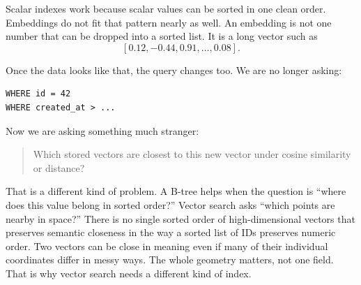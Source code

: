 \documentclass[12pt]{article}
\begin{document}
Scalar indexes work because scalar values can be sorted in one clean
order. Embeddings do not fit that pattern nearly as well. An embedding is
not one number that can be dropped into a sorted list. It is a long vector
such as
\[
[0.12, -0.44, 0.91, \dots, 0.08].
\]

Once the data looks like that, the query changes too. We are no longer
asking:

\begin{verbatim}
WHERE id = 42
WHERE created_at > ...
\end{verbatim}

Now we are asking something much stranger:

\begin{quote}
Which stored vectors are closest to this new vector under cosine
similarity or distance?
\end{quote}

That is a different kind of problem. A B-tree helps when the question is
``where does this value belong in sorted order?'' Vector search asks
``which points are nearby in space?'' There is no single sorted order of
high-dimensional vectors that preserves semantic closeness in the way a
sorted list of IDs preserves numeric order. Two vectors can be close in
meaning even if many of their individual coordinates differ in messy ways.
The whole geometry matters, not one field. That is why vector search needs
a different kind of index.
\end{document}
